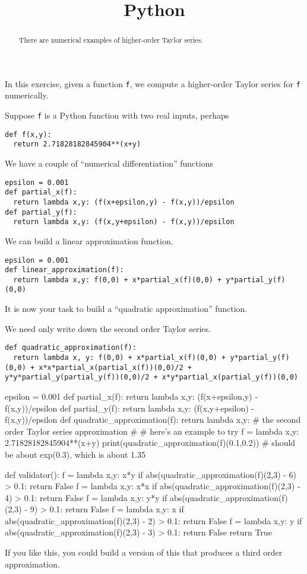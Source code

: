 \documentclass{ximera}
\title{Python}
\begin{document}
\begin{abstract}
  There are numerical examples of higher-order Taylor series.
\end{abstract}

In this exercise, given a function \verb|f|, we compute a higher-order
Taylor series for \verb|f| numerically.

\begin{question}
  Suppose \verb|f| is a Python function with two real inputs, perhaps
\begin{verbatim}
def f(x,y):
  return 2.71828182845904**(x+y)
\end{verbatim}
We have a couple of ``numerical differentiation'' functions
\begin{verbatim}
epsilon = 0.001
def partial_x(f):
  return lambda x,y: (f(x+epsilon,y) - f(x,y))/epsilon
def partial_y(f):
  return lambda x,y: (f(x,y+epsilon) - f(x,y))/epsilon
\end{verbatim}
We can build a linear approximation function.
\begin{verbatim}
epsilon = 0.001
def linear_approximation(f):
  return lambda x,y: f(0,0) + x*partial_x(f)(0,0) + y*partial_y(f)(0,0) 
\end{verbatim}
It is now your task to build a ``quadratic approximation'' function.

  \begin{solution}
    \begin{hint}
We need only write down the second order Taylor series.
\begin{verbatim}
def quadratic_approximation(f):
  return lambda x, y: f(0,0) + x*partial_x(f)(0,0) + y*partial_y(f)(0,0) + x*x*partial_x(partial_x(f))(0,0)/2 + y*y*partial_y(partial_y(f))(0,0)/2 + x*y*partial_x(partial_y(f))(0,0)
\end{verbatim}
    \end{hint}
    \begin{python}
epsilon = 0.001
def partial_x(f):
  return lambda x,y: (f(x+epsilon,y) - f(x,y))/epsilon
def partial_y(f):
  return lambda x,y: (f(x,y+epsilon) - f(x,y))/epsilon
def quadratic_approximation(f):
  return lambda x,y: # the second order Taylor series approximation
#
# here's an example to try
f = lambda x,y: 2.71828182845904**(x+y)
print(quadratic_approximation(f)(0.1,0.2)) # should be about exp(0.3), which is about 1.35

def validator():
  f = lambda x,y: x*y
  if abs(quadratic_approximation(f)(2,3) - 6) > 0.1:
    return False
  f = lambda x,y: x*x
  if abs(quadratic_approximation(f)(2,3) - 4) > 0.1:
    return False
  f = lambda x,y: y*y
  if abs(quadratic_approximation(f)(2,3) - 9) > 0.1:
    return False
  f = lambda x,y: x
  if abs(quadratic_approximation(f)(2,3) - 2) > 0.1:
    return False
  f = lambda x,y: y
  if abs(quadratic_approximation(f)(2,3) - 3) > 0.1:
    return False
  return True
    \end{python}
  \end{solution}

  If you like this, you could build a version of this that produces a third order approximation.
  
\end{question}
\end{document}
